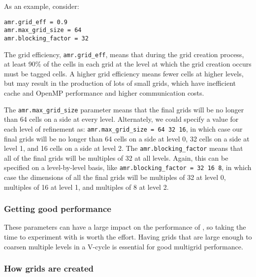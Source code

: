 As an example, consider:
\begin{lstlisting}
amr.grid_eff = 0.9
amr.max_grid_size = 64 
amr.blocking_factor = 32
\end{lstlisting}

The grid efficiency, {\tt amr.grid\_eff}, means that during the grid
creation process, at least 90\% of the cells in each grid at the level
at which the grid creation occurs must be tagged cells.  A higher
grid efficiency means fewer cells at higher levels, but may result
in the production of lots of small grids, which have inefficient cache
and OpenMP performance and higher communication costs.

The {\tt amr.max\_grid\_size} parameter means that the final grids
will be no longer than 64 cells on a side at every level.
Alternately, we could specify a value for each level of refinement as:
{\tt amr.max\_grid\_size = 64 32 16}, in which case our final grids
will be no longer than 64 cells on a side at level 0, 32 cells on a
side at level 1, and 16 cells on a side at level 2.  The {\tt amr.blocking\_factor}
means that all of the final grids will be multiples of 32 at all levels.
Again, this can be specified on a level-by-level basis, like
{\tt amr.blocking\_factor = 32 16 8}, in which case the 
dimensions of all the final grids will be multiples of 32
at level 0, multiples of 16 at level 1, and multiples of 8 at level 2.

\subsubsection{Getting good performance}

These parameters can have a large impact on the performance
of \iamr, so taking the time to experiment with is worth the effort.
Having grids that are large enough to coarsen multiple levels in a
V-cycle is essential for good multigrid performance.

\subsubsection{How grids are created}

